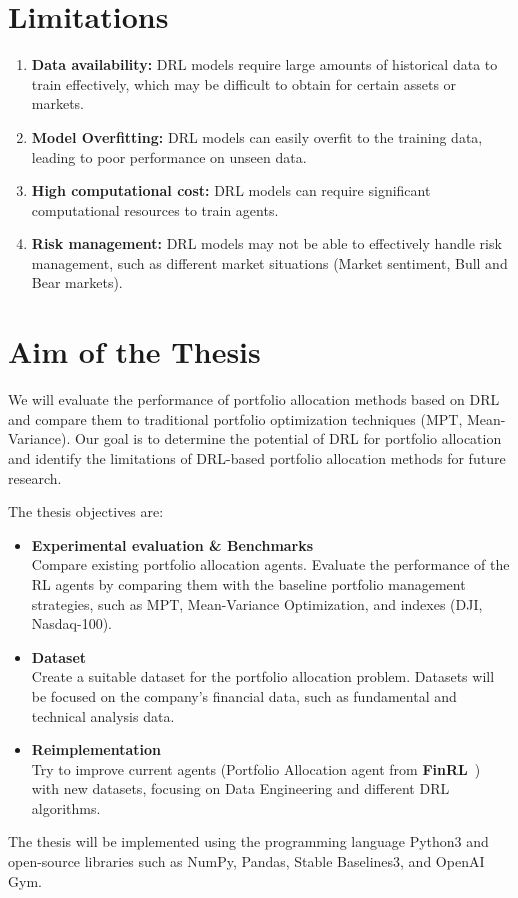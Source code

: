 \documentclass[../xlapes02]{subfiles}
\begin{document}
\section{Limitations}\label{sec:limitations}

\begin{enumerate}
    \item \textbf{Data availability:} DRL models require large amounts of historical data to train effectively, which may be difficult to obtain for certain assets or markets.
    \item \textbf{Model Overfitting:} DRL models can easily overfit to the training data, leading to poor performance on unseen data.
    \item \textbf{High computational cost:} DRL models can require significant computational resources to train agents.
    \item \textbf{Risk management:} DRL models may not be able to effectively handle risk management, such as different market situations (Market sentiment, Bull and Bear markets).
\end{enumerate}


\section{Aim of the Thesis}\label{sec:aim-of-the-thesis}
We will evaluate the performance of portfolio allocation methods based on DRL and compare them to traditional portfolio optimization techniques (MPT, Mean-Variance).
Our goal is to determine the potential of DRL for portfolio allocation and identify the limitations of DRL-based portfolio allocation methods for future research.

The thesis objectives are:
\begin{itemize}
    \item \textbf{Experimental evaluation \& Benchmarks}\\
    Compare existing portfolio allocation agents.
    Evaluate the performance of the RL agents by comparing them with the baseline portfolio management strategies, such as MPT, Mean-Variance Optimization, and indexes (DJI, Nasdaq-100).
    \item \textbf{Dataset}\\
    Create a suitable dataset for the portfolio allocation problem.
    Datasets will be focused on the company's financial data, such as fundamental and technical analysis data.
    \item \textbf{Reimplementation}\\
    Try to improve current agents (Portfolio Allocation agent from \textbf{FinRL}~\cite{finrl-portfolio-allocation-2020}) with new datasets, focusing on Data Engineering and different DRL algorithms.
\end{itemize}

The thesis will be implemented using the programming language Python3 and open-source libraries such as NumPy, Pandas, Stable Baselines3, and OpenAI Gym.
\end{document}
